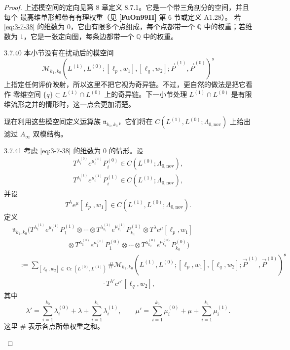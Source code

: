 \begin{proof}
上述模空间的定向见第 8 章定义 8.7.1。它是一个带三角剖分的空间，并且每个
最高维单形都带有有理权重（见 \textbf{[FuOn99II]} 第 6 节或定义 A1.28）。
若 \eqref{eq:3-7-38} 的维数为 $0$，它由有限多个点组成，每个点都带一个
$\mathbb Q$ 中的权重；若维数为 $1$，它是一张定向图，每条边都带一个
$\mathbb Q$ 中的权重。

\begin{remark}{3.7.40}\label{rem:3-7-40}
本小节没有在扰动后的模空间
\[
 \mathcal M_{k_1,k_0}
 (L^{(1)},L^{(0)};[\ell_p,w_1],[\ell_q,w_2];
 \vec P^{(1)},\vec P^{(0)})^{\mathfrak s}
\]
上指定任何评价映射，所以这里不把它视为奇异链。不过，更自然的做法是把它看作
零维空间 $\{q\}\subset L^{(1)}\cap L^{(0)}$ 上的奇异链。下一小节处理
$L^{(1)}\cap L^{(0)}$ 是有限维流形之并的情形时，这一点会更加清楚。
\end{remark}

现在利用这些模空间定义运算族 $\mathfrak n_{k_1,k_0}$，它们将在
$C(L^{(1)},L^{(0)};\Lambda_{0,\mathrm{nov}})$ 上给出滤过
$A_\infty$ 双模结构。

\begin{definition}{3.7.41}\label{def:3-7-41}
考虑 \eqref{eq:3-7-38} 的维数为 $0$ 的情形。设
\[
\begin{gathered}
 T^{\lambda_i^{(0)}}e^{\mu_i^{(0)}}P_i^{(0)}
 \in C(L^{(0)};\Lambda_{0,\mathrm{nov}}),\\
 T^{\lambda_i^{(1)}}e^{\mu_i^{(1)}}P_i^{(1)}
 \in C(L^{(1)};\Lambda_{0,\mathrm{nov}}),
\end{gathered}
\]
并设
\[
 T^\lambda e^\mu[\ell_p,w_1]
 \in C(L^{(1)},L^{(0)};\Lambda_{0,\mathrm{nov}}).
\]
定义
\[
\begin{aligned}
&\mathfrak n_{k_1,k_0}\bigl(
 T^{\lambda_1^{(1)}}e^{\mu_1^{(1)}}P_1^{(1)}
 \otimes\cdots\otimes
 T^{\lambda_{k_1}^{(1)}}e^{\mu_{k_1}^{(1)}}P_{k_1}^{(1)}
 \otimes T^\lambda e^\mu[\ell_p,w_1]\\
&\hspace{8em}\otimes
 T^{\lambda_1^{(0)}}e^{\mu_1^{(0)}}P_1^{(0)}
 \otimes\cdots\otimes
 T^{\lambda_{k_0}^{(0)}}e^{\mu_{k_0}^{(0)}}P_{k_0}^{(0)}
 \bigr)\\
&\quad:=
 \sum_{[\ell_q,w_2]\in\operatorname{Cr}(L^{(0)},L^{(1)})}
 \#\mathcal M_{k_1,k_0}
 (L^{(1)},L^{(0)};[\ell_p,w_1],[\ell_q,w_2];
 \vec P^{(1)},\vec P^{(0)})^{\mathfrak s}\\
&\hspace{13em}\cdot
 T^{\lambda'}e^{\mu'}[\ell_q,w_2],
\end{aligned}
\]
其中
\[
 \lambda'
 =\sum_{i=1}^{k_0}\lambda_i^{(0)}
  +\lambda+\sum_{i=1}^{k_1}\lambda_i^{(1)},
 \qquad
 \mu'
 =\sum_{i=1}^{k_0}\mu_i^{(0)}
  +\mu+\sum_{i=1}^{k_1}\mu_i^{(1)}.
\]
这里 $\#$ 表示各点所带权重之和。
\end{definition}


\end{proof}
